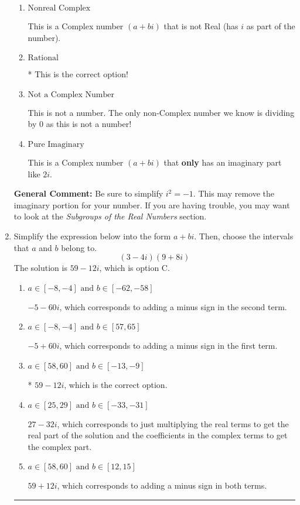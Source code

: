 \documentclass{extbook}[14pt]
\newcommand{\litem}[1]{\item #1

\rule{\textwidth}{0.4pt}}
\begin{document}
\begin{enumerate}
{\begin{enumerate}[label=\Alph*.]
These cannot be written as a fraction of Integers. Remember: $\pi$ is not an Integer!
\item \( \text{Nonreal Complex} \)

This is a Complex number $(a+bi)$ that is not Real (has $i$ as part of the number).
\item \( \text{Rational} \)

* This is the correct option!
\item \( \text{Not a Complex Number} \)

This is not a number. The only non-Complex number we know is dividing by 0 as this is not a number!
\item \( \text{Pure Imaginary} \)

This is a Complex number $(a+bi)$ that \textbf{only} has an imaginary part like $2i$.
\end{enumerate}

\textbf{General Comment:} Be sure to simplify $i^2 = -1$. This may remove the imaginary portion for your number. If you are having trouble, you may want to look at the \textit{Subgroups of the Real Numbers} section.
}
\litem{
Simplify the expression below into the form $a+bi$. Then, choose the intervals that $a$ and $b$ belong to.
\[ (3 - 4 i)(9 + 8 i) \]The solution is \( 59 - 12 i \), which is option C.\begin{enumerate}[label=\Alph*.]
\item \( a \in [-8, -4] \text{ and } b \in [-62, -58] \)

 $-5 - 60 i$, which corresponds to adding a minus sign in the second term.
\item \( a \in [-8, -4] \text{ and } b \in [57, 65] \)

 $-5 + 60 i$, which corresponds to adding a minus sign in the first term.
\item \( a \in [58, 60] \text{ and } b \in [-13, -9] \)

* $59 - 12 i$, which is the correct option.
\item \( a \in [25, 29] \text{ and } b \in [-33, -31] \)

 $27 - 32 i$, which corresponds to just multiplying the real terms to get the real part of the solution and the coefficients in the complex terms to get the complex part.
\item \( a \in [58, 60] \text{ and } b \in [12, 15] \)

 $59 + 12 i$, which corresponds to adding a minus sign in both terms.
\end{enumerate}

}
\end{enumerate}
\end{document}
